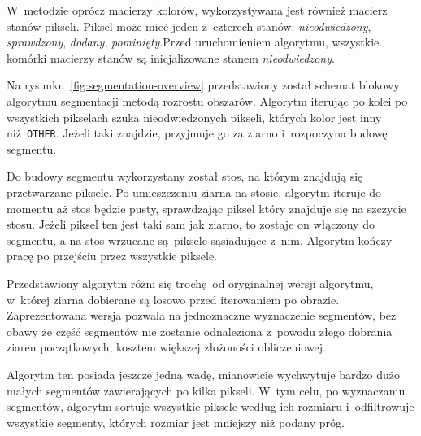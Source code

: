 W~metodzie oprócz macierzy kolorów, wykorzystywana jest również macierz stanów pikseli. Piksel może mieć jeden z~czterech stanów: \emph{nieodwiedzony}, \emph{sprawdzony}, \emph{dodany}, \emph{pominięty}.Przed uruchomieniem algorytmu, wszystkie komórki macierzy stanów są inicjalizowane stanem \emph{nieodwiedzony}.


Na rysunku~\ref{fig:segmentation-overview} przedstawiony został schemat blokowy algorytmu segmentacji metodą rozrostu obszarów. Algorytm iterując po kolei po wszystkich pikselach szuka nieodwiedzonych pikseli, których kolor jest inny niż \texttt{OTHER}. Jeżeli taki znajdzie, przyjmuje go za ziarno i~rozpoczyna budowę segmentu.

Do budowy segmentu wykorzystany został stos, na którym znajdują się przetwarzane piksele. Po umieszczeniu ziarna na stosie, algorytm iteruje do momentu aż stos będzie pusty, sprawdzając piksel który znajduje się na szczycie stosu. Jeżeli piksel ten jest taki sam jak ziarno, to zostaje on włączony do segmentu, a na stos wrzucane są piksele sąsiadujące z~nim. Algorytm kończy pracę po przejściu przez wszystkie piksele.

Przedstawiony algorytm różni się trochę od oryginalnej wersji algorytmu, w~której ziarna dobierane są losowo przed iterowaniem po obrazie. Zaprezentowana wersja pozwala na jednoznaczne wyznaczenie segmentów, bez obawy że część segmentów nie zostanie odnaleziona z~powodu złego dobrania ziaren początkowych, kosztem większej złożoności obliczeniowej.

Algorytm ten posiada jeszcze jedną wadę, mianowicie wychwytuje bardzo dużo małych segmentów zawierających po kilka pikseli. W~tym celu, po wyznaczaniu segmentów, algorytm sortuje wszystkie piksele według ich rozmiaru i~odfiltrowuje wszystkie segmenty, których rozmiar jest mniejszy niż podany próg.
